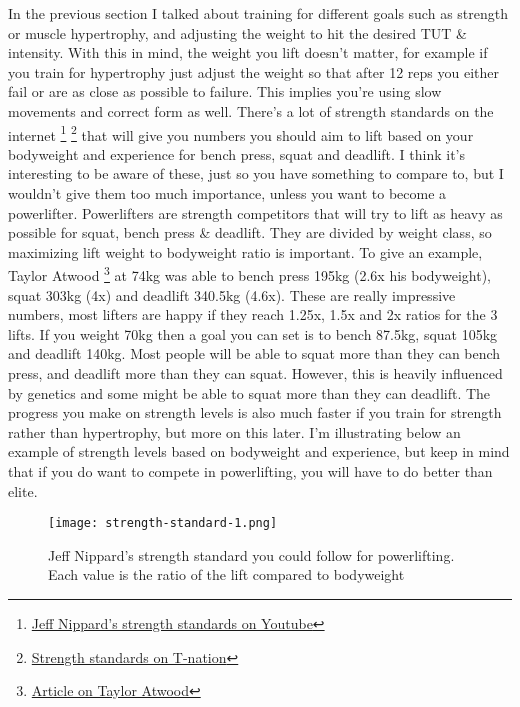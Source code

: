 \documentclass[openany, 12pt]{book}
\begin{document}
        In the previous section I talked about training for different goals such as strength or muscle hypertrophy, and adjusting the weight to hit the desired TUT \& intensity.
        With this in mind, the weight you lift doesn't matter, for example if you train for hypertrophy just adjust the weight so that after 12 reps you either fail or are as close
        as possible to failure. This implies you're using slow movements and correct form as well. There's a lot of strength standards on the internet
        \footnote{\href{https://www.youtube.com/watch?v=LrDJXIQ_-eg}{Jeff Nippard's strength standards on Youtube}}
        \footnote{\href{https://www.t-nation.com/training/strength-standards-are-you-strong/}{Strength standards on T-nation}} that will give you numbers you should aim to lift based
        on your bodyweight and experience for bench press, squat and deadlift. I think it's interesting to be aware of these, just so you have something to compare to, but I wouldn't give
        them too much importance, unless you want to become a powerlifter. Powerlifters are strength competitors that will try to lift as heavy as possible for squat, bench press \& deadlift.
        They are divided by weight class, so maximizing lift weight to bodyweight ratio is important. To give an example, Taylor Atwood
        \footnote{\href{https://barbend.com/taylor-atwood-3-american-records-2021-usapl-nationals/}{Article on Taylor Atwood}}
        at 74kg was able to bench press 195kg (2.6x his bodyweight), squat 303kg (4x) and deadlift 340.5kg (4.6x). These are really impressive numbers, most lifters are happy
        if they reach 1.25x, 1.5x and 2x ratios for the 3 lifts. If you weight 70kg then a goal you can set is to bench 87.5kg, squat 105kg and deadlift 140kg.
        Most people will be able to squat more than they can bench press, and deadlift more than they can squat. However, this is heavily influenced by genetics and some might be able to
        squat more than they can deadlift. The progress you make on strength levels is also much faster if you train for strength rather than hypertrophy, but more on this later. I'm
        illustrating below an example of strength levels based on bodyweight and experience, but keep in mind that if you do want to compete in powerlifting, you will have to do better
        than elite.

        \begin{figure}[h]
		\centering
		\texttt{[image: strength-standard-1.png]}
		\caption{Jeff Nippard’s strength standard you could follow for powerlifting. Each value is the ratio of the lift compared to bodyweight}
		\label{fig14}
	\end{figure}
        
\end{document}
